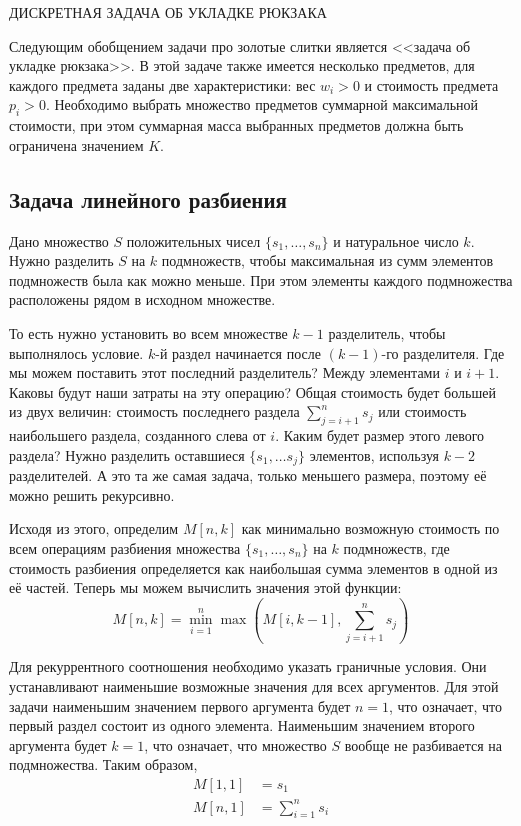 \documentclass[14pt]{book}
\begin{document}
ДИСКРЕТНАЯ ЗАДАЧА ОБ УКЛАДКЕ РЮКЗАКА

Следующим обобщением задачи про золотые слитки является <<задача об укладке рюкзака>>. В этой задаче также имеется несколько предметов, для каждого предмета заданы две характеристики: вес $w_i > 0$ и стоимость предмета $p_i > 0$. Необходимо выбрать множество предметов суммарной максимальной стоимости, при этом суммарная масса выбранных предметов должна быть ограничена значением $K$.

\subsection{Задача линейного разбиения}

Дано множество $S$ положительных чисел $\{s_1, \ldots , s_n\}$ и натуральное число $k$.
Нужно разделить $S$ на $k$ подмножеств, чтобы максимальная из сумм элементов подмножеств была 
как можно меньше. При этом элементы каждого подмножества расположены рядом в исходном множестве.

То есть нужно установить во всем множестве $k-1$ разделитель, чтобы выполнялось условие.
$k$-й раздел начинается после $(k-1)$-го разделителя. Где мы можем поставить этот последний
разделитель? Между элементами $i$ и $i+1$. Каковы будут наши затраты на эту операцию?
Общая стоимость будет большей из двух величин: стоимость последнего раздела $\sum_{j=i+1}^{n}s_j$
или стоимость наибольшего раздела, созданного слева от $i$. Каким будет размер этого левого раздела?
Нужно разделить оставшиеся $\{s_1,\ldots s_j\}$ элементов, используя $k-2$ разделителей.
А это та же самая задача, только меньшего размера, поэтому её можно решить рекурсивно.

Исходя из этого, определим $M[n, k]$ как минимально возможную стоимость по всем операциям
разбиения множества $\{s_1, \ldots , s_n\}$ на $k$ подмножеств, где стоимость разбиения
определяется как наибольшая сумма элементов в одной из её частей. Теперь мы можем вычислить
значения этой функции:
$$ M[n,k] = \min_{i=1}^{n}\max\left(M[i,k-1], \sum_{j=i+1}^{n}s_j\right)$$

Для рекуррентного соотношения необходимо указать граничные условия. Они устанавливают
наименьшие возможные значения для всех аргументов. Для этой задачи наименьшим значением
первого аргумента будет $n=1$, что означает, что первый раздел состоит из одного элемента.
Наименьшим значением второго аргумента будет $k=1$, что означает, что множество $S$
вообще не разбивается на подмножества. Таким образом,
\begin{align*}
M[1,1] &= s_1 \\
M[n,1] &= \sum_{i=1}^{n}s_i
\end{align*}
\end{document}

